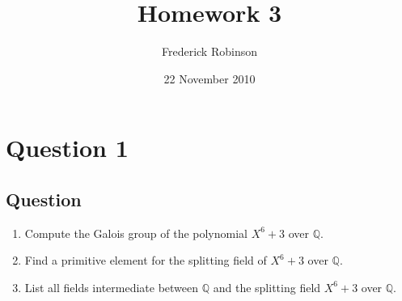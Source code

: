 \documentclass[11pt]{article}
\begin{document}



\title{Homework 3}
\author{Frederick Robinson}
\date{22 November 2010}
\maketitle




\section{Question 1}
\subsection{Question}
\begin{enumerate}
\item Compute the Galois group of the polynomial $X^6+3$ over $\mathbb{Q}$.
\item Find a primitive element for the splitting field of $X^6+3$ over $\mathbb{Q}$.
\item List all fields intermediate between $\mathbb{Q}$ and the splitting field $X^6+3$ over $\mathbb{Q}$.
\end{enumerate}
\end{document}
